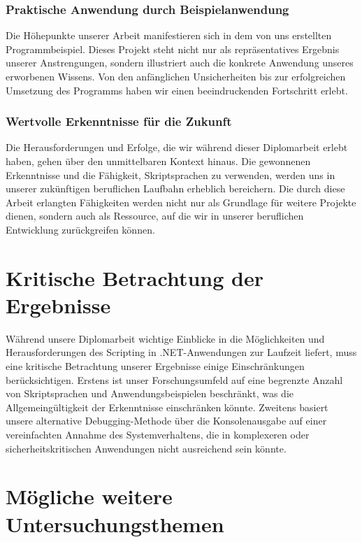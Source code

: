 \subsubsection*{Praktische Anwendung durch Beispielanwendung}

Die Höhepunkte unserer Arbeit manifestieren sich in dem von uns erstellten Programmbeispiel. 
Dieses Projekt steht nicht nur als repräsentatives Ergebnis unserer Anstrengungen, sondern 
illustriert auch die konkrete Anwendung unseres erworbenen Wissens. Von den anfänglichen 
Unsicherheiten bis zur erfolgreichen Umsetzung des Programms haben wir einen beeindruckenden 
Fortschritt erlebt.

\subsubsection*{Wertvolle Erkenntnisse für die Zukunft}

Die Herausforderungen und Erfolge, die wir während dieser Diplomarbeit erlebt haben, gehen 
über den unmittelbaren Kontext hinaus. Die gewonnenen Erkenntnisse und die Fähigkeit, 
Skriptsprachen zu verwenden, werden uns in unserer zukünftigen beruflichen Laufbahn erheblich 
bereichern. Die durch diese Arbeit erlangten Fähigkeiten werden nicht nur als Grundlage für 
weitere Projekte dienen, sondern auch als Ressource, auf die wir in unserer beruflichen 
Entwicklung zurückgreifen können.

\newpage
\section{Kritische Betrachtung der Ergebnisse}

Während unsere Diplomarbeit wichtige Einblicke in die Möglichkeiten und Herausforderungen 
des Scripting in .NET-Anwendungen zur Laufzeit liefert, muss eine kritische Betrachtung 
unserer Ergebnisse einige Einschränkungen berücksichtigen. Erstens ist unser Forschungsumfeld 
auf eine begrenzte Anzahl von Skriptsprachen und Anwendungsbeispielen beschränkt, 
was die Allgemeingültigkeit der Erkenntnisse einschränken könnte. Zweitens basiert 
unsere alternative Debugging-Methode über die Konsolenausgabe auf einer vereinfachten 
Annahme des Systemverhaltens, die in komplexeren oder sicherheitskritischen Anwendungen 
nicht ausreichend sein könnte. 

\newpage
\section{Mögliche weitere Untersuchungsthemen}

